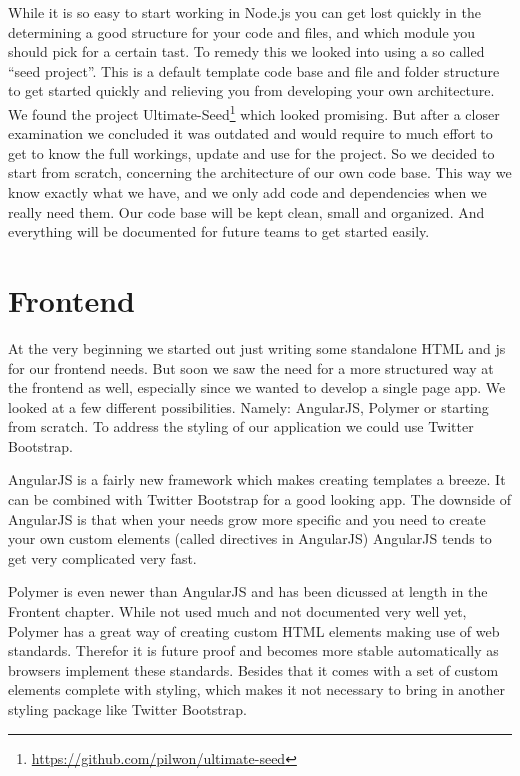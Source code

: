 While it is so easy to start working in Node.js
you can get lost quickly in the determining a good structure
for your code and files,
and which module you should pick for a certain tast.
To remedy this we looked into using a so called ``seed project''.
This is a default template code base and file and folder structure
to get started quickly and relieving you from developing your own architecture.
We found the project
Ultimate-Seed\footnote{\url{https://github.com/pilwon/ultimate-seed}}
which looked promising.
But after a closer examination we concluded it was outdated
and would require to much effort to get to know the full workings,
update and use for the \gls{project}.
So we decided to start from scratch,
concerning the architecture of our own code base.
This way we know exactly what we have,
and we only add code and dependencies when we really need them.
Our code base will be kept clean, small and organized.
And everything will be documented for future teams to get started easily.

\section{Frontend}
At the very beginning we started out
just writing some standalone HTML and \gls{js} for our frontend needs.
But soon we saw the need for a more structured way at the frontend as well,
especially since we wanted to develop a single page app.
We looked at a few different possibilities.
Namely: AngularJS, Polymer or starting from scratch.
To address the styling of our application we could use Twitter Bootstrap.

AngularJS is a fairly new framework which makes creating templates a breeze.
It can be combined with Twitter Bootstrap for a good looking app.
The downside of AngularJS is that when your needs grow more specific
and you need to create your own custom elements
(called directives in AngularJS)
AngularJS tends to get very complicated very fast.

Polymer is even newer than AngularJS
and has been dicussed at length in the Frontent chapter.
While not used much and not documented very well yet,
Polymer has a great way of creating custom HTML elements
making use of web standards.
Therefor it is future proof
and becomes more stable automatically as browsers implement these standards.
Besides that it comes with a set of custom elements
complete with styling,
which makes it not necessary to bring in another styling package
like Twitter Bootstrap.

